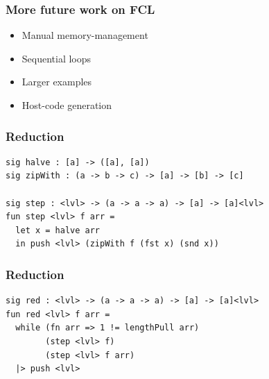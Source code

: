 \documentclass{beamer}
\begin{document}
\appendix
\backupbegin

\begin{frame}
  \frametitle{More future work on FCL}

  \begin{itemize}
  \item Manual memory-management
  \item Sequential loops
  \item Larger examples
  \item Host-code generation
  \end{itemize}
\end{frame}

\begin{frame}[fragile]
  \frametitle{Reduction}
\begin{verbatim}
sig halve : [a] -> ([a], [a])
sig zipWith : (a -> b -> c) -> [a] -> [b] -> [c]

sig step : <lvl> -> (a -> a -> a) -> [a] -> [a]<lvl>
fun step <lvl> f arr =
  let x = halve arr
  in push <lvl> (zipWith f (fst x) (snd x))
\end{verbatim}



\end{frame}

\begin{frame}[fragile]
  \frametitle{Reduction}
  \begin{verbatim}
sig red : <lvl> -> (a -> a -> a) -> [a] -> [a]<lvl>
fun red <lvl> f arr =
  while (fn arr => 1 != lengthPull arr)
        (step <lvl> f)
        (step <lvl> f arr)
  |> push <lvl>
\end{verbatim}
\end{frame}
\end{document}
